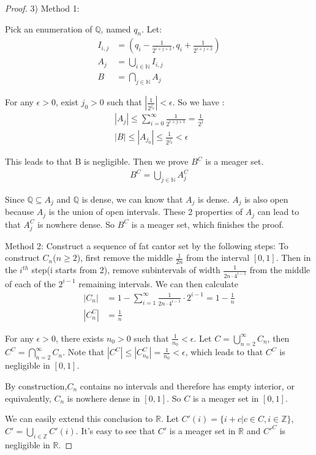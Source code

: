 \documentclass[a4paper, linespread=1.5]{article}
\begin{document}
\begin{proof}
		3) Method 1:
		
		Pick an enumeration of $\mathbb{Q}$, named $q_n$. Let:
		\begin{align*}
			I_{i,j}&=(q_i-\frac{1}{2^{i+j+2}},q_i+\frac{1}{2^{i+j+2}})\\
			A_j&=\bigcup\limits_{i\in \mathbb{N}}I_{i,j}\\
			B&=\bigcap\limits_{j\in\mathbb{N}}A_j
		\end{align*}
		
		For any $\epsilon>0$, exist $j_0>0$ such that $|\frac{1}{2^{j_0}}|<\epsilon$. So we have :
		\begin{align*}
			|A_j|\le \sum_{i=0}^{\infty} \frac{1}{2^{i+j+1}}=\frac{1}{2^j} \\
			|B|\le|A_{j_0}|\le \frac{1}{2^{j_0}} < \epsilon
		\end{align*}
		
		This leads to that B is negligible. Then we prove $B^C$ is a meager set.
		\begin{align*}
			B^C=\bigcup\limits_{j\in\mathbb{N}}A_j^C
		\end{align*}
		
		Since $\mathbb{Q}\subseteq A_j$ and $\mathbb{Q}$ is dense, we can know that $A_j$ is dense. $A_j$ is also open because $A_j$ is the union of open intervals. These 2 properties of $A_j$ can lead to that $A_j^C$ is nowhere dense. So $B^C$ is a meager set, which finishes the proof.
		
		Method 2:
		Construct a sequence of fat cantor set by the following steps: To construct $C_n$($n\ge2$), first remove the middle $\frac{1}{2n}$ from the interval $[0,1]$. Then in the $i^{th}$ step(i starts from 2), remove subintervals of width $\frac{1}{2n\cdot4^{i-1}}$ from the middle of each of the $2^{i-1}$ remaining intervals. We can then calculate 
		\begin{align*}
			|C_n|&=1-\sum_{i=1}^{\infty}{\frac{1}{2n\cdot4^{i-1}}\cdot2^{i-1}=1-\frac{1}{n}}\\
			|C_n^C|&=\frac{1}{n}
		\end{align*}
		
		For any $\epsilon>0$, there exists $n_0>0$ such that $\frac{1}{n_0}<\epsilon$. Let $C= \bigcup\limits_{n=2}^{\infty}C_n$, then $C^C=\bigcap\limits_{n=2}^{\infty}C_n$. Note that $|C^C|\le|C_{n_0}^C|=\frac{1}{n_0}<\epsilon$, which leads to that $C^C$ is negligible in $[0,1]$.
		
		By construction,$C_n$ contains no intervals and therefore has empty interior, or equivalently, $C_n$ is nowhere dense in $[0,1]$. So $C$ is a meager set in $[0,1]$. 
		
		We can easily extend this conclusion to $\mathbb{R}$. Let $C'(i)=\{i+c | c\in C, i\in\mathbb{Z}\}$, $C'=\bigcup\limits_{i\in\mathbb{Z}}C'(i)$. It's easy to see that $C'$ is a meager set in $\mathbb{R}$ and $C'^C$ is negligible in $\mathbb{R}$.
	\end{proof}
	
	
    
    
\end{document}

